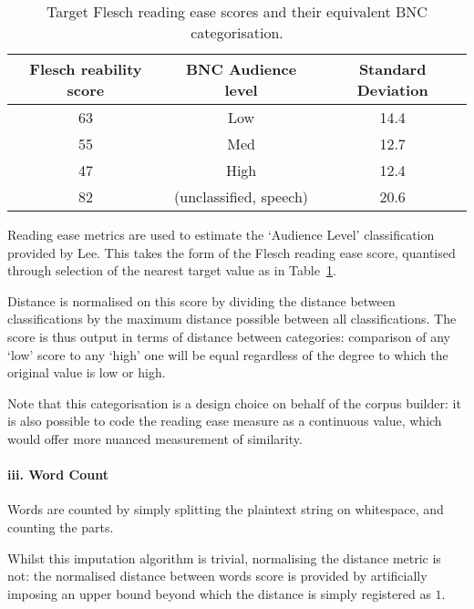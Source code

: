 \begin{table}[h]
    \center
    \begin{tabular}{|c|c|c|}
        \hline 
        Flesch reability score & BNC Audience level & Standard Deviation \\
        \hline 
        63 & Low & 14.4\\
        55 & Med & 12.7 \\
        47 & High & 12.4\\
        82 & (unclassified, speech) & 20.6 \\
        \hline
    \end{tabular}
    \caption{Target Flesch reading ease scores and their equivalent BNC categorisation.}
    \label{tab:rebuilding:method:fscore}
\end{table}


Reading ease metrics are used to estimate the `Audience Level' classification provided by Lee.  This takes the form of the Flesch reading ease score\cite{flesch1948new}, quantised through selection of the nearest target value as in Table~\ref{tab:rebuilding:method:fscore}.

Distance is normalised on this score by dividing the distance between classifications by the maximum distance possible between all classifications.  The score is thus output in terms of distance between categories: comparison of any `low' score to any `high' one will be equal regardless of the degree to which the original value is low or high.

Note that this categorisation is a design choice on behalf of the corpus builder: it is also possible to code the reading ease measure as a continuous value, which would offer more nuanced measurement of similarity.


\paragraph{iii. Word Count}
Words are counted by simply splitting the plaintext string on whitespace, and counting the parts.

Whilst this imputation algorithm is trivial, normalising the distance metric is not: the normalised distance between words score is provided by artificially imposing an upper bound beyond which the distance is simply registered as $1$.




